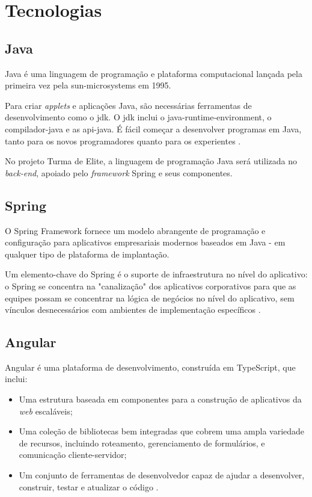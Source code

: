 \documentclass[
    12pt,               %
    openright,          %
    oneside,
    a4paper,            %
    paginasA3,  %
    english,            %
    brazil              %
    ]{ifsp-spo-inf-ctds} %
\begin{document}
\section{Tecnologias}
\subsection{Java}
Java é uma linguagem de programação e plataforma computacional lançada pela primeira vez pela \gls{sun-microsystems} em 1995.


Para criar \textit{applets} e aplicações Java, são necessárias ferramentas de desenvolvimento como o {\ac{jdk}}. O {\ac{jdk}} inclui o \gls{java-runtime-environment}, o \gls{compilador-java} e as \gls{api-java}. É fácil começar a desenvolver programas em Java, tanto para os novos programadores quanto para os experientes \cite{java:2016}.


No projeto Turma de Elite, a linguagem de programação Java será utilizada no \textit{back-end}, apoiado pelo \textit{\gls{framework}} Spring e seus componentes.


\subsection{Spring}
O Spring Framework fornece um modelo abrangente de programação e configuração para aplicativos empresariais modernos baseados em Java - em qualquer tipo de plataforma de implantação.


Um elemento-chave do Spring é o suporte de infraestrutura no nível do aplicativo: o Spring se concentra na "canalização" dos aplicativos corporativos para que as equipes possam se concentrar na lógica de negócios no nível do aplicativo, sem vínculos desnecessários com ambientes de implementação específicos \cite{spring:2021}.

\subsection {Angular}
Angular é uma plataforma de desenvolvimento, construída em 
TypeScript, que inclui:
\begin{itemize}
\item Uma estrutura baseada em componentes para a construção de aplicativos da \textit{\gls{web}} escaláveis;
\item Uma coleção de bibliotecas bem integradas que cobrem uma ampla variedade de recursos, incluindo roteamento, gerenciamento de formulários, e comunicação cliente-servidor;
\item Um conjunto de ferramentas de desenvolvedor capaz de ajudar a desenvolver, construir, testar e atualizar o código \cite{angular:2021}.
\end{itemize}
\end{document}
